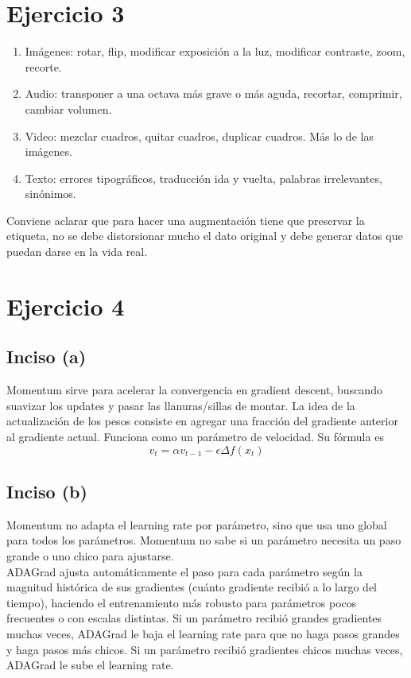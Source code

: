 \documentclass[12pt, a4paper]{article}
\begin{document}
    \section*{Ejercicio 3}
        \begin{enumerate}
            \item Imágenes: rotar, flip, modificar exposición a la luz, modificar contraste, zoom, recorte.
            \item Audio: transponer a una octava más grave o más aguda, recortar, comprimir, cambiar volumen.
            \item Video: mezclar cuadros, quitar cuadros, duplicar cuadros. Más lo de las imágenes.
            \item Texto: errores tipográficos, traducción ida y vuelta, palabras irrelevantes, sinónimos.
        \end{enumerate}
        \noindent Conviene aclarar que para hacer una augmentación tiene que preservar la etiqueta, no se debe distorsionar mucho el dato original y debe generar datos que puedan darse en la vida real.
    \section*{Ejercicio 4}
        \subsection*{Inciso (a)}
            \noindent Momentum sirve para acelerar la convergencia en gradient descent, buscando suavizar los updates y pasar las llanuras/sillas de montar. La idea de la actualización de los pesos consiste en agregar una fracción del gradiente anterior al gradiente actual. Funciona como un parámetro de velocidad. Su fórmula es \[v_{t} = \alpha v_{t-1} - \epsilon \Delta f(x_{t})\]
        \subsection*{Inciso (b)}
            \noindent Momentum no adapta el learning rate por parámetro, sino que usa uno global para todos los parámetros. Momentum no sabe si un parámetro necesita un paso grande o uno chico para ajustarse. \\
            ADAGrad ajusta automáticamente el paso para cada parámetro según la magnitud histórica de sus gradientes (cuánto gradiente recibió a lo largo del tiempo), haciendo el entrenamiento más robusto para parámetros pocos frecuentes o con escalas distintas. Si un parámetro recibió grandes gradientes muchas veces, ADAGrad le baja el learning rate para que no haga pasos grandes y haga pasos más chicos. Si un parámetro recibió gradientes chicos muchas veces, ADAGrad le sube el learning rate.
\end{document}
